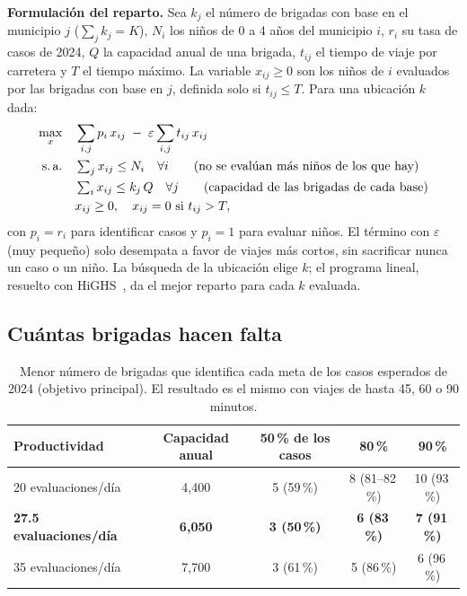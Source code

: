 \documentclass[11pt,letterpaper]{article}
\begin{document}
\textbf{Formulación del reparto.} Sea $k_j$ el número de brigadas con base en el municipio $j$ ($\sum_j k_j = K$), $N_i$ los niños de 0 a 4 años del municipio $i$, $r_i$ su tasa de casos de 2024, $Q$ la capacidad anual de una brigada, $t_{ij}$ el tiempo de viaje por carretera y $T$ el tiempo máximo. La variable $x_{ij}\ge 0$ son los niños de $i$ evaluados por las brigadas con base en $j$, definida solo si $t_{ij}\le T$. Para una ubicación $k$ dada:
\begin{equation}
\label{eq:tamizaje}
\begin{aligned}
\max_{x}\quad & \sum_{i,j} p_i\, x_{ij} \;-\; \varepsilon \sum_{i,j} t_{ij}\, x_{ij} \\
\text{s.\,a.}\quad & \textstyle\sum_{j} x_{ij} \le N_i \quad \forall i \qquad \text{(no se evalúan más niños de los que hay)}\\
& \textstyle\sum_{i} x_{ij} \le k_j\, Q \quad \forall j \qquad \text{(capacidad de las brigadas de cada base)}\\
& x_{ij} \ge 0, \quad x_{ij}=0 \text{ si } t_{ij} > T,
\end{aligned}
\end{equation}
con $p_i = r_i$ para identificar casos y $p_i = 1$ para evaluar niños. El término con $\varepsilon$ (muy pequeño) solo desempata a favor de viajes más cortos, sin sacrificar nunca un caso o un niño. La búsqueda de la ubicación elige $k$; el programa lineal, resuelto con HiGHS~\cite{scipy}, da el mejor reparto para cada $k$ evaluada.

\subsection{Cuántas brigadas hacen falta}

\begin{table}[htbp]
\centering
\small
\begin{tabular}{lcccc}
\toprule
Productividad & Capacidad anual & 50\,\% de los casos & 80\,\% & 90\,\% \\
\midrule
20 evaluaciones/día & 4{,}400 & 5 (59\,\%) & 8 (81--82\,\%) & 10 (93\,\%) \\
\textbf{27.5 evaluaciones/día} & \textbf{6{,}050} & \textbf{3 (50\,\%)} & \textbf{6 (83\,\%)} & \textbf{7 (91\,\%)} \\
35 evaluaciones/día & 7{,}700 & 3 (61\,\%) & 5 (86\,\%) & 6 (96\,\%) \\
\bottomrule
\end{tabular}
\caption{Menor número de brigadas que identifica cada meta de los casos esperados de 2024 (objetivo principal). El resultado es el mismo con viajes de hasta 45, 60 o 90 minutos.}
\label{tab:tamizaje}
\end{table}
\end{document}

